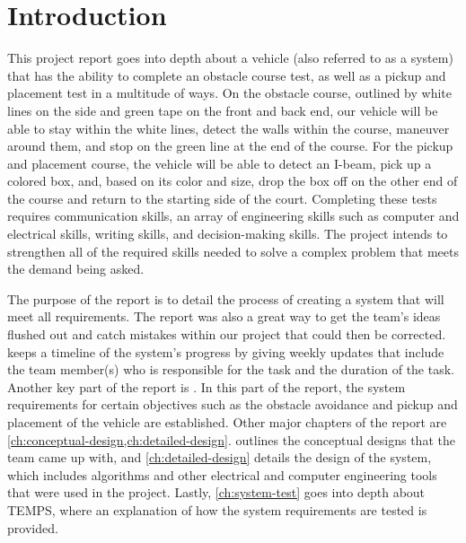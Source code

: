 \documentclass[11pt]{report}
\begin{document}
\chapter{Introduction}\label{ch:introduction}

This project report goes into depth about a vehicle (also referred to as a system) that has the ability to complete an obstacle course test, as well as a pickup and placement test in a multitude of ways. On the obstacle course, outlined by white lines on the side and green tape on the front and back end, our vehicle will be able to stay within the white lines, detect the walls within the course, maneuver around them, and stop on the green line at the end of the course. For the pickup and placement course, the vehicle will be able to detect an I-beam, pick up a colored box, and, based on its color and size, drop the box off on the other end of the course and return to the starting side of the court. Completing these tests requires communication skills, an array of engineering skills such as computer and electrical skills, writing skills, and decision-making skills. The project intends to strengthen all of the required skills needed to solve a complex problem that meets the demand being asked.
\par The purpose of the report is to detail the process of creating a system that will meet all requirements. The report was also a great way to get the team’s ideas flushed out and catch mistakes within our project that could then be corrected.  keeps a timeline of the system’s progress by giving weekly updates that include the team member(s) who is responsible for the task and the duration of the task. Another key part of the report is .  In this part of the report, the system requirements for certain objectives such as the obstacle avoidance and pickup and placement of the vehicle are established. Other major chapters of the report are \cref{ch:conceptual-design,ch:detailed-design}.  outlines the conceptual designs that the team came up with, and \cref{ch:detailed-design} details the design of the system, which includes algorithms and other electrical and computer engineering tools that were used in the project. Lastly, \cref{ch:system-test} goes into depth about \gls{TEMPS}, where an explanation of how the system requirements are tested is provided.
\end{document}
